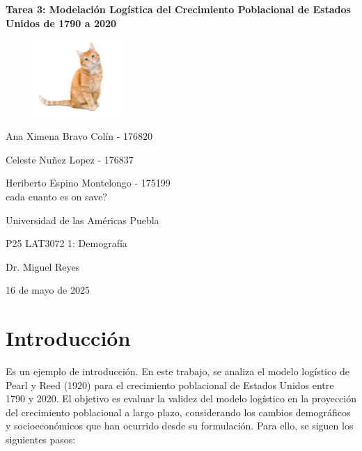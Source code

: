 \documentclass[12pt]{article}
\begin{document}
\begin{titlepage}
    \centering
    \vspace*{0.cm}
    \textbf{\Large Tarea 3: Modelación Logística del Crecimiento Poblacional de Estados Unidos de 1790 a 2020}\\
    \vspace{2cm}
    \begin{figure}[ht]
    \centering
    \includegraphics[width=0.3\textwidth]{cat.jpg}
    \end{figure}

    \vspace{1.5cm}

    Ana Ximena Bravo Colín - 176820

    
    Celeste Nuñez Lopez - 176837


    Heriberto Espino Montelongo - 175199\\[2cm]

    cada cuanto es on save?

    Universidad de las Américas Puebla

    
    P25 LAT3072 1: Demografía

    Dr. Miguel Reyes 
    
    16 de mayo de 2025
\end{titlepage}

\renewcommand{\contentsname}{Índice}
\renewcommand{\thepage}{\Roman{page}}
\setcounter{page}{1}
\tableofcontents
\newpage

\renewcommand{\thepage}{\arabic{page}}
\setcounter{page}{1}

\section{Introducción}


Es un ejemplo de introducción. En este trabajo, se analiza el modelo logístico de Pearl y Reed (1920) para el crecimiento poblacional de Estados Unidos entre 1790 y 2020. El objetivo es evaluar la validez del modelo logístico en la proyección del crecimiento poblacional a largo plazo, considerando los cambios demográficos y socioeconómicos que han ocurrido desde su formulación. Para ello, se siguen los siguientes pasos:
\end{document}
